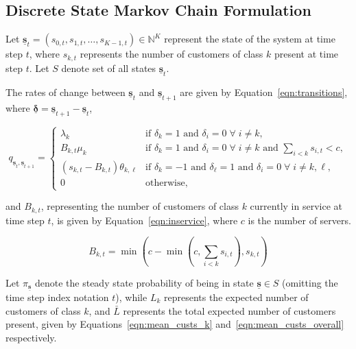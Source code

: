 \documentclass{article}
\begin{document}
\subsection{Discrete State Markov Chain Formulation}\label{sec:state_formulation}
Let
$\underline{\mathbf{s}}_t = (s_{0,t}, s_{1,t}, \dots, s_{K-1,t}) \in \mathbb{N}^K$
represent the state of the system at time step $t$, where $s_{k,t}$ represents
the number of customers of class $k$ present at time step $t$. Let $S$ denote
set of all states $\underline{\mathbf{s}}_t$. 

The rates of change between $\underline{\mathbf{s}}_t$ and
$\underline{\mathbf{s}}_{t+1}$ are given by Equation~\ref{eqn:transitions},
where $\underline{\mathbf{\delta}} = \underline{\mathbf{s}}_{t+1} - \underline{\mathbf{s}}_t$,

\begin{equation}\label{eqn:transitions}
q_{\underline{\mathbf{s}}_t, \underline{\mathbf{s}}_{t+1}} = 
\begin{cases}
\lambda_k & \text{if } \delta_k = 1 \text{ and } \delta_i = 0 \; \forall \; i \neq k, \\
B_{k,t} \mu_k & \text{if } \delta_k = 1 \text{ and } \delta_i = 0 \; \forall \; i \neq k \text{ and } \sum_{i < k} s_{i,t} < c, \\
(s_{k,t} - B_{k,t}) \theta_{k,\ell} & \text{if } \delta_{k} = -1 \text{ and } \delta_{\ell} = 1 \text{ and } \delta_i = 0 \; \forall \; i \neq k, \ell, \\
0 & \text{otherwise,}
\end{cases}
\end{equation}

and $B_{k,t}$, representing the number of customers of class $k$ currently in
service at time step $t$, is given by Equation~\ref{eqn:inservice}, where $c$
is the number of servers.

\begin{equation}\label{eqn:inservice}
B_{k,t} =\min\left(c - \min\left(c, \sum_{i < k} s_{i,t}\right), s_{k,t}\right)
\end{equation}

Let $\pi_{\underline{\mathbf{s}}}$ denote the steady state probability of being
in state $\underline{\mathbf{s}} \in S$ (omitting the time step index notation
$t$), while $L_k$ represents the expected number of customers of class $k$, and
$\bar{L}$ represents the total expected number of customers present, given by
Equations~\ref{eqn:mean_custs_k} and~\ref{eqn:mean_custs_overall} respectively.
\end{document}
